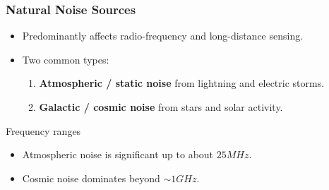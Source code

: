 \begin{frame}
	\frametitle{Natural Noise Sources}
	\begin{itemize}
		\item Predominantly affects radio-frequency and long-distance sensing.
		\item Two common types:
		\begin{enumerate}
			\item \textbf{Atmospheric / static noise} from lightning and electric storms.
			\item \textbf{Galactic / cosmic noise} from stars and solar activity.
		\end{enumerate}
	\end{itemize}
	\begin{block}{Frequency ranges}
		\begin{itemize}
			\item Atmospheric noise is significant up to about $25\unit{MHz}$.
			\item Cosmic noise dominates beyond $\sim 1\unit{GHz}$.
		\end{itemize}
	\end{block}
\end{frame}
